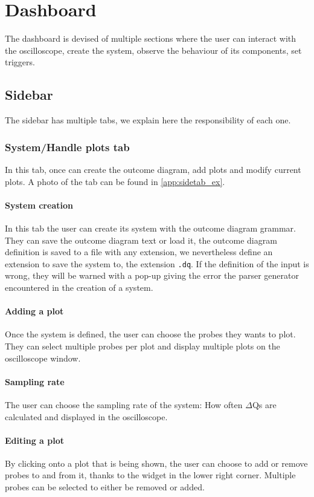 \section{Dashboard}
    The dashboard is devised of multiple sections where the user can interact with the oscilloscope, create the system, observe the behaviour of its components, set triggers.

    \subsection{Sidebar}
        The sidebar has multiple tabs, we explain here the responsibility of each one.

    \subsubsection{System/Handle plots tab}
        In this tab, once can create the outcome diagram, add plots and modify current plots. A photo of the tab can be found in \cref{app:sidetab_ex}.
    \paragraph{System creation}
        In this tab the user can create its system with the outcome diagram grammar. They can save the outcome diagram text or load it, the outcome diagram definition is saved to a file with any extension, we nevertheless define an extension to save the system to, the extension \texttt{.dq}.
        If the definition of the input is wrong, they will be warned with a pop-up giving the error the parser generator encountered in the creation of a system.

    \paragraph{Adding a plot}
        Once the system is defined, the user can choose the probes they wants to plot. They can select multiple probes per plot and display multiple plots on the oscilloscope window.
    
    \paragraph{Sampling rate}
        The user can choose the sampling rate of the system: How often $\Delta$Qs are calculated and displayed in the oscilloscope.

    \paragraph{Editing a plot}
        By clicking onto a plot that is being shown, the user can choose to add or remove probes to and from it, thanks to the widget in the lower right corner. Multiple probes can be selected to either be removed or added.

